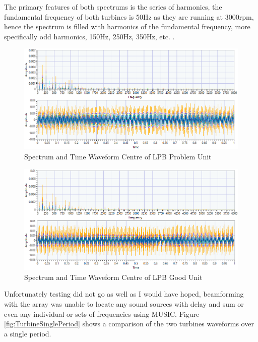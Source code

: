 \documentclass{UoNMCHA}
\numberwithin{equation}{section}
\begin{document}
    The primary features of both spectrums is the series of harmonics, the fundamental frequency of both turbines is 50Hz as they are running at 3000rpm, hence the spectrum is filled with harmonics of the fundamental frequency, more specifically odd harmonics, 150Hz, 250Hz, 350Hz, etc. . 

    \begin{figure} [H]
        \centering
        \includegraphics[keepaspectratio, width = \textwidth]{Figures/U5_LPB.png}
        \caption{Spectrum and Time Waveform Centre of LPB Problem Unit}
        \label{fig:U5 Signal}
    \end{figure}

    \begin{figure} [H]
        \centering
        \includegraphics[keepaspectratio, width = \textwidth]{Figures/U6_LPB.png}
        \caption{Spectrum and Time Waveform Centre of LPB Good Unit}
        \label{fig:U6 Signal}
    \end{figure}

    Unfortunately testing did not go as well as I would have hoped, beamforming with the array was unable to locate any sound sources with delay and sum or even any individual or sets of frequencies using MUSIC. Figure \ref{fig:TurbineSinglePeriod} shows a comparison of the two turbines waveforms over a single period. 
\end{document}
